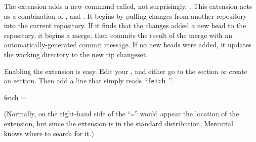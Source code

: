 The  extension adds a new command called, not
surprisingly, .  This extension acts as a combination of
,  and .  It begins by pulling
changes from another repository into the current repository.  If it
finds that the changes added a new head to the repository, it begins a
merge, then commits the result of the merge with an
automatically-generated commit message.  If no new heads were added,
it updates the working directory to the new tip changeset.

Enabling the  extension is easy.  Edit your
, and either go to the  section
or create an  section.  Then add a line that
simply reads ``\Verb+fetch +''.
\begin{codesample2}
  [extensions]
  fetch =
\end{codesample2}
(Normally, on the right-hand side of the ``\texttt{=}'' would appear
the location of the extension, but since the  extension
is in the standard distribution, Mercurial knows where to search for
it.)

